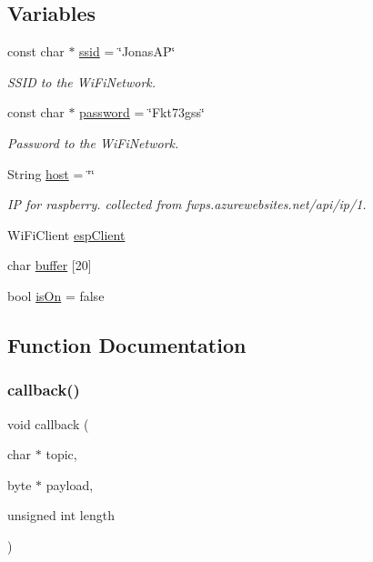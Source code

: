 \subsection*{Variables}
\begin{DoxyCompactItemize}
\item 
const char $\ast$ \mbox{\hyperlink{_morning_sun_esp_8ino_a587ba0cb07f02913598610049a3bbb79}{ssid}} = \char`\"{}Jonas\+AP\char`\"{}
\begin{DoxyCompactList}\small\item\em S\+S\+ID to the Wi\+Fi\+Network. \end{DoxyCompactList}\item 
const char $\ast$ \mbox{\hyperlink{_morning_sun_esp_8ino_aa4a2ebcb494493f648ae1e6975672575}{password}} = \char`\"{}Fkt73gss\char`\"{}
\begin{DoxyCompactList}\small\item\em Password to the Wi\+Fi\+Network. \end{DoxyCompactList}\item 
String \mbox{\hyperlink{_morning_sun_esp_8ino_a2502b12b30261ef4dea2ff97a6b78cab}{host}} = \char`\"{}\char`\"{}
\begin{DoxyCompactList}\small\item\em IP for raspberry. collected from fwps.\+azurewebsites.\+net/api/ip/1. \end{DoxyCompactList}\item 
Wi\+Fi\+Client \mbox{\hyperlink{_morning_sun_esp_8ino_abd77e757e4b3bb6f1e4b42b21ea9e040}{esp\+Client}}
\item 
char \mbox{\hyperlink{_morning_sun_esp_8ino_a5819dbc2d305e99e930c734a0d28bc3b}{buffer}} \mbox{[}20\mbox{]}
\item 
bool \mbox{\hyperlink{_morning_sun_esp_8ino_ae530c5af75c42fc2bd1fb588c38aa332}{is\+On}} = false
\end{DoxyCompactItemize}


\subsection{Function Documentation}
\mbox{\label{_morning_sun_esp_8ino_ac3a129f66dc859e2b7279565f4e1de78}} 
\subsubsection{\texorpdfstring{callback()}{callback()}}
{\footnotesize\ttfamily void callback (\begin{DoxyParamCaption}\item[{char $\ast$}]{topic,  }\item[{byte $\ast$}]{payload,  }\item[{unsigned int}]{length }\end{DoxyParamCaption})}


